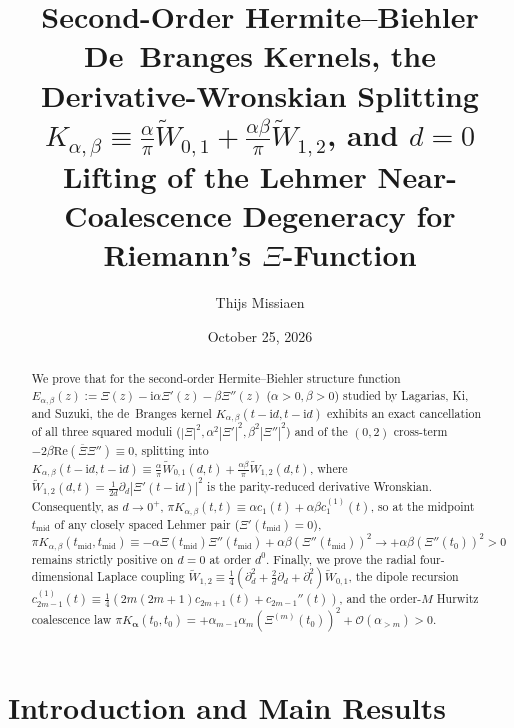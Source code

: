 \documentclass[11pt,reqno]{amsart}
\title[Second-Order De~Branges Kernels and $d=0$ Lehmer Lifting]{Second-Order Hermite--Biehler De~Branges Kernels, the Derivative-Wronskian Splitting $K_{\alpha,\beta} \equiv \frac{\alpha}{\pi}\widetilde{W}_{0,1} + \frac{\alpha\beta}{\pi}\widetilde{W}_{1,2}$, and $d=0$ Lifting of the Lehmer Near-Coalescence Degeneracy for Riemann's $\Xi$-Function}
\author{Thijs Missiaen}
\date{October 25, 2026}
\theoremstyle{definition}
\theoremstyle{remark}
\numberwithin{equation}{section}
\newcommand{\ii}{\mathrm{i}}
\newcommand{\Rea}{\mathrm{Re}}
\begin{document}
\sloppy

\begin{abstract}
We prove that for the second-order Hermite--Biehler structure function $E_{\alpha,\beta}(z) := \Xi(z) - \ii\alpha\Xi'(z) - \beta\Xi''(z)$ ($\alpha > 0, \beta > 0$) studied by Lagarias, Ki, and Suzuki, the de~Branges kernel $K_{\alpha,\beta}(t-\ii d, t-\ii d)$ exhibits an exact cancellation of all three squared moduli ($|\Xi|^2, \alpha^2|\Xi'|^2, \beta^2|\Xi''|^2$) and of the $(0,2)$ cross-term $-2\beta\Rea(\overline{\Xi}\Xi'') \equiv 0$, splitting into $K_{\alpha,\beta}(t-\ii d, t-\ii d) \equiv \frac{\alpha}{\pi}\widetilde{W}_{0,1}(d,t) + \frac{\alpha\beta}{\pi}\widetilde{W}_{1,2}(d,t)$, where $\widetilde{W}_{1,2}(d,t) = \frac{1}{2d}\partial_d|\Xi'(t-\ii d)|^2$ is the parity-reduced derivative Wronskian. Consequently, as $d \to 0^+$, $\pi K_{\alpha,\beta}(t,t) \equiv \alpha c_1(t) + \alpha\beta c_1^{(1)}(t)$, so at the midpoint $t_{\mathrm{mid}}$ of any closely spaced Lehmer pair ($\Xi'(t_{\mathrm{mid}}) = 0$), $\pi K_{\alpha,\beta}(t_{\mathrm{mid}}, t_{\mathrm{mid}}) \equiv -\alpha\Xi(t_{\mathrm{mid}})\Xi''(t_{\mathrm{mid}}) + \alpha\beta(\Xi''(t_{\mathrm{mid}}))^2 \to +\alpha\beta(\Xi''(t_0))^2 > 0$ remains strictly positive on $d = 0$ at order $d^0$. Finally, we prove the radial four-dimensional Laplace coupling $\widetilde{W}_{1,2} \equiv \frac{1}{4}(\partial_d^2 + \frac{2}{d}\partial_d + \partial_t^2)\widetilde{W}_{0,1}$, the dipole recursion $c_{2m-1}^{(1)}(t) \equiv \frac{1}{4}(2m(2m+1)c_{2m+1}(t) + c_{2m-1}''(t))$, and the order-$M$ Hurwitz coalescence law $\pi K_{\boldsymbol{\alpha}}(t_0, t_0) = +\alpha_{m-1}\alpha_m(\Xi^{(m)}(t_0))^2 + \mathcal{O}(\alpha_{>m}) > 0$.
\end{abstract}

\maketitle

\section{Introduction and Main Results}\label{sec:intro}
\end{document}
